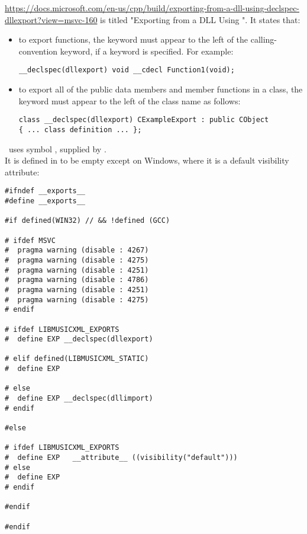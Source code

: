 \url{https://docs.microsoft.com/en-us/cpp/build/exporting-from-a-dll-using-declspec-dllexport?view=msvc-160} is titled "Exporting from a DLL Using ". It states that:
\begin{itemize}
\item to export functions, the  keyword must appear to the left of the calling-convention keyword, if a keyword is specified. For example:
\begin{lstlisting}[language=CPlusPlus]
__declspec(dllexport) void __cdecl Function1(void);
\end{lstlisting}

\item to export all of the public data members and member functions in a class, the keyword must appear to the left of the class name as follows:
\begin{lstlisting}[language=CPlusPlus]
class __declspec(dllexport) CExampleExport : public CObject
{ ... class definition ... };
\end{lstlisting}

\end{itemize}

\mf\ uses symbol , supplied by \libmusicxmlsamples. \\
It is defined in  to be empty except on Windows, where it is a default visibility attribute:
\begin{lstlisting}[language=CPlusPlus]
#ifndef __exports__
#define __exports__

#if defined(WIN32) // && !defined (GCC)

# ifdef MSVC
#  pragma warning (disable : 4267)
#  pragma warning (disable : 4275)
#  pragma warning (disable : 4251)
#  pragma warning (disable : 4786)
#  pragma warning (disable : 4251)
#  pragma warning (disable : 4275)
# endif

# ifdef LIBMUSICXML_EXPORTS
#  define EXP __declspec(dllexport)

# elif defined(LIBMUSICXML_STATIC)
#  define EXP

# else
#  define EXP __declspec(dllimport)
# endif

#else

# ifdef LIBMUSICXML_EXPORTS
#  define EXP	__attribute__ ((visibility("default")))
# else
#  define EXP
# endif

#endif

#endif
\end{lstlisting}


